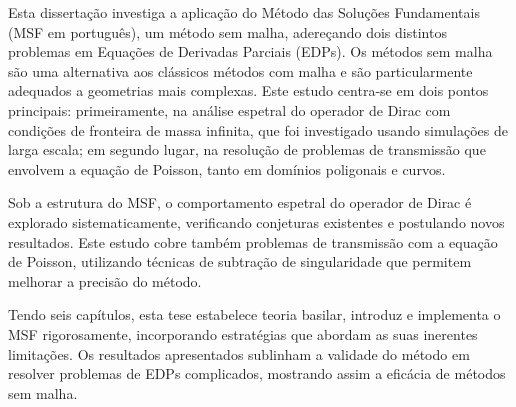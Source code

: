 \acresetall
\noindent
Esta dissertação investiga a aplicação do Método das Soluções Fundamentais (MSF em português), um método sem malha, adereçando dois distintos problemas em Equações de Derivadas Parciais (EDPs). Os métodos sem malha são uma alternativa aos clássicos métodos com malha e são particularmente adequados a geometrias mais complexas. Este estudo centra-se em dois pontos principais: primeiramente, na análise espetral do operador de Dirac com condições de fronteira de massa infinita, que foi investigado usando simulações de larga escala; em segundo lugar, na resolução de problemas de transmissão que envolvem a equação de Poisson, tanto em domínios poligonais e curvos.

Sob a estrutura do MSF, o comportamento espetral do operador de Dirac é explorado sistematicamente, verificando conjeturas existentes e postulando novos resultados. Este estudo cobre também problemas de transmissão com a equação de Poisson, utilizando técnicas de subtração de singularidade que permitem melhorar a precisão do método.

Tendo seis capítulos, esta tese estabelece teoria basilar, introduz e implementa o MSF rigorosamente, incorporando estratégias que abordam as suas inerentes limitações. Os resultados apresentados sublinham a validade do método em resolver problemas de EDPs complicados, mostrando assim a eficácia de métodos sem malha.